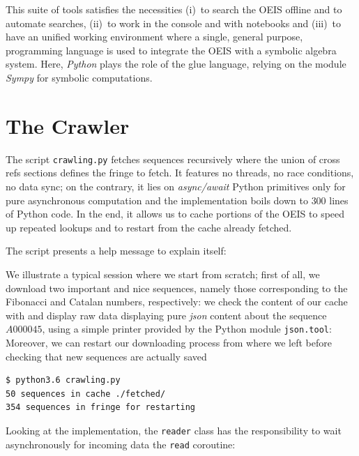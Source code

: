 
This suite of tools satisfies the necessities (i)~to search the OEIS offline
and to automate searches, (ii)~to work in the console and with notebooks and
(iii)~to have an unified working environment where a single, general purpose,
programming language is used to integrate the OEIS with a symbolic algebra
system. Here, \textit{Python} plays the role of the glue language, relying
on the module \textit{Sympy} for symbolic computations.

\section{The Crawler}

The script \verb|crawling.py| fetches sequences recursively where the union of
cross refs sections defines the fringe to fetch.  It features no threads, no
race conditions, no data sync; on the contrary, it lies on \textit{async/await}
Python primitives only for pure asynchronous computation and the implementation
boils down to $300$ lines of Python code.  In the end, it allows us to cache
portions of the OEIS to speed up repeated lookups and to restart from the cache
already fetched. 

The script presents a help message to explain itself:

We illustrate a typical session where we start from scratch; first of all, we
download two important and nice sequences, namely those corresponding to the
Fibonacci and Catalan numbers, respectively:
we check the content of our cache with
and display raw data displaying pure \textit{json} content about
the sequence $A000045$, using a simple printer provided by the Python module
\verb|json.tool|:
Moreover, we can restart our downloading process from where we left before
checking that new sequences are actually saved
\begin{Verbatim}[fontsize=\small]
$ python3.6 crawling.py 
50 sequences in cache ./fetched/
354 sequences in fringe for restarting
\end{Verbatim}

Looking at the implementation, the \verb|reader| class has the responsibility
to wait asynchronously for incoming data the \verb|read| coroutine:
\inputminted[fontsize=\small,stripnl=false,firstline=28,lastline=39]
    {python}{deps/oeis-tools/src/crawling.py}

